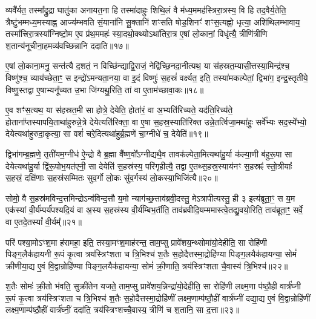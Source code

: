 व्यवै᳚र्यत॒ तस्मा᳚द्रु॒द्रा घातु॑का अनायत॒ना हि तस्मा॑दाहुः शिथि॒लं वै म॑ध्य॒ममह॑स्त्रिरा॒त्रस्य॒ वि हि तद॒वैर्य॒तेति॒ त्रैष्टु॑भम्मध्य॒मस्याह्न॒ आज्य॑म्भवति सं॒याना॑नि सू॒क्तानि॑ शꣳसति षोड॒शिनꣳ॑ शꣳस॒त्यह्नो॒ धृत्या॒ अशि॑थिलम्भावाय॒ तस्मा᳚त्त्रिरा॒त्रस्या᳚ग्निष्टो॒म ए॒व प्र॑थ॒ममहः॑ स्या॒दथो॒क्थ्यो\-ऽथा॑तिरा॒त्र ए॒षां लो॒कानां॒ विधृ॑त्यै॒ त्रीणि॑त्रीणि श॒तान्य॑नूचीना॒हमव्य॑वच्छिन्नानि ददाति॥१७॥

ए॒षां लो॒काना॒मनु॒ सन्त॑त्यै द॒शतं॒ न विच्छि॑न्द्याद्वि॒राजं॒ नेद्वि॑च्छि॒नदा॒नीत्यथ॒ या स॑हस्रत॒म्यासी॒त्तस्या॒मिन्द्र॑श्च॒ विष्णु॑श्च॒ व्याय॑च्छेता॒ꣳ॒ स इन्द्रो॑\-ऽमन्यता॒नया॒ वा इ॒दं विष्णुः॑ स॒हस्रं॑ वर्क्ष्यत॒ इति॒ तस्या॑मकल्पेतां॒ द्विभा॑ग॒ इन्द्र॒स्तृती॑ये॒ विष्णु॒स्तद्वा ए॒षाभ्यनू᳚च्यत उ॒भा जि॑ग्यथु॒रिति॒ तां वा ए॒ताम॑च्छावा॒कः॥१८॥

ए॒व शꣳ॑स॒त्यथ॒ या स॑हस्रत॒मी सा होत्रे॒ देयेति॒ होता॑रं॒ वा अ॒भ्यति॑रिच्यते॒ यद॑ति॒रिच्य॑ते॒ होताना᳚प्तस्यापयि॒ता\-था॑हुरुन्ने॒त्रे देयेत्यति॑रिक्ता॒ वा ए॒षा स॒हस्र॒स्याति॑रिक्त उन्ने॒तर्त्विजा॒मथा॑हुः॒ सर्वे᳚भ्यः सद॒स्ये᳚भ्यो॒ देयेत्यथा॑हुरुदा॒कृत्या॒ सा वशं॑ चरे॒दित्यथा॑हुर्ब्र॒ह्मणे॑ चा॒ग्नीधे॑ च॒ देयेति॑॥१९॥

द्विभा॑गम्ब्र॒ह्मणे॒ तृती॑यम॒ग्नीध॑ ऐ॒न्द्रो वै ब्र॒ह्मा वै᳚ष्ण॒वो᳚\-ऽग्नीद्यथै॒व तावक॑ल्पेता॒मित्यथा॑हु॒र्या क॑ल्या॒णी ब॑हुरू॒पा सा देयेत्यथा॑हु॒र्या द्वि॑रू॒पोभ॒यत॑एनी॒ सा देयेति॑ स॒हस्र॑स्य॒ परि॑गृहीत्यै॒ तद्वा ए॒तथ्स॒हस्र॒स्याय॑नꣳ स॒हस्रꣴ॑ स्तो॒त्रीयाः᳚ स॒हस्रं॒ दक्षि॑णाः स॒हस्र॑सम्मितः सुव॒र्गो लो॒कः सु॑व॒र्गस्य॑ लो॒कस्या॒भिजि॑त्यै॥२०॥

{\anuvakamend[{अ॒ब्र॒वी॒च्च॒ तद॒न्तरि॑क्षन्ददात्यच्छावा॒कश्च॒ देयेति॑ स॒प्तच॑त्वारिꣳशच्च॥५॥}]}

सोमो॒ वै स॒हस्र॑मविन्द॒त्तमिन्द्रो\-ऽन्व॑विन्द॒त्तौ य॒मो न्याग॑च्छ॒त्ताव॑ब्रवी॒दस्तु॒ मे\-ऽत्रापीत्यस्तु॒ ही ३ इत्य॑ब्रूता॒ꣳ॒ स य॒म एक॑स्यां वी॒र्य॑म्पर्य॑पश्यदि॒यं वा अ॒स्य स॒हस्र॑स्य वी॒र्य॑म्बिभ॒र्तीति॒ ताव॑ब्रवीदि॒यम्ममास्त्वे॒तद्यु॒वयो॒रिति॒ ताव॑ब्रूता॒ꣳ॒ सर्वे॒ वा ए॒तदे॒तस्यां᳚ वी॒र्यम्᳚॥२१॥

परि॑ पश्या॒मो\-ऽꣳश॒मा ह॑रामहा॒ इति॒ तस्या॒मꣳश॒माह॑रन्त॒ ताम॒प्सु प्रावे॑शय॒न्थ्सोमा॑यो॒देहीति॒ सा रोहि॑णी पिङ्ग॒लैक॑हायनी रू॒पं कृ॒त्वा त्रय॑स्त्रिꣳशता च त्रि॒भिश्च॑ श॒तैः स॒होदैत्तस्मा॒द्रोहि॑ण्या पिङ्ग॒लयैक॑हायन्या॒ सोमं॑ क्रीणीया॒द्य ए॒वं वि॒द्वान्रोहि॑ण्या पिङ्ग॒लयैक॑हायन्या॒ सोमं॑ क्री॒णाति॒ त्रय॑स्त्रिꣳशता चै॒वास्य॑ त्रि॒भिश्च॑॥२२॥

श॒तैः सोमः॑ क्री॒तो भ॑वति॒ सुक्री॑तेन यजते॒ ताम॒प्सु प्रावे॑शय॒न्निन्द्रा॑यो॒देहीति॒ सा रोहि॑णी लक्ष्म॒णा प॑ष्ठौ॒ही वार्त्र॑घ्नी रू॒पं कृ॒त्वा त्रय॑स्त्रिꣳशता च त्रि॒भिश्च॑ श॒तैः स॒होदैत्तस्मा॒द्रोहि॑णीं लक्ष्म॒णाम्प॑ष्ठौ॒हीं वार्त्र॑घ्नीं दद्या॒द्य ए॒वं वि॒द्वान्रोहि॑णीं लक्ष्म॒णाम्प॑ष्ठौ॒हीं वार्त्र॑घ्नीं॒ ददा॑ति॒ त्रय॑स्त्रिꣳशच्चै॒वास्य॒ त्रीणि॑ च श॒तानि॒ सा द॒त्ता॥२३॥

